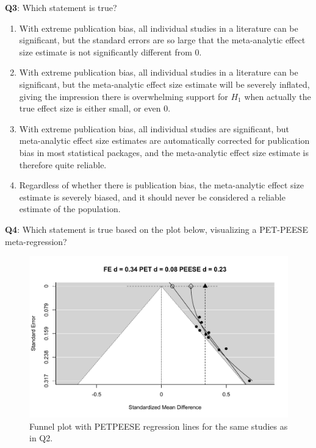 \documentclass[
  oneside]{book}
\providecommand{\tightlist}{%
  \setlength{\itemsep}{0pt}\setlength{\parskip}{0pt}}
\begin{document}
\textbf{Q3}: Which statement is true?

\begin{enumerate}
\def\labelenumi{\Alph{enumi})}
\tightlist
\item
  With extreme publication bias, all individual studies in a literature can be significant, but the standard errors are so large that the meta-analytic effect size estimate is not significantly different from 0.
\item
  With extreme publication bias, all individual studies in a literature can be significant, but the meta-analytic effect size estimate will be severely inflated, giving the impression there is overwhelming support for \(H_1\) when actually the true effect size is either small, or even 0.
\item
  With extreme publication bias, all individual studies are significant, but
  meta-analytic effect size estimates are automatically corrected for publication bias in most statistical packages, and the meta-analytic effect size estimate is therefore quite reliable.
\item
  Regardless of whether there is publication bias, the meta-analytic effect size estimate is severely biased, and it should never be considered a reliable estimate of the population.
\end{enumerate}

\textbf{Q4}: Which statement is true based on the plot below, visualizing a PET-PEESE meta-regression?



\begin{figure}

{\centering \includegraphics[width=1\linewidth]{12-bias_files/figure-latex/petpeeseq4-1} 

}

\caption{Funnel plot with PETPEESE regression lines for the same studies as in Q2.}\label{fig:petpeeseq4}
\end{figure}
\end{document}
